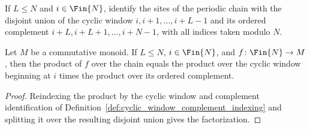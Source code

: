 \begin{definition}
    \label{def:cyclic_window_complement_indexing}
    \leanok
    If $L\leq N$ and $i\in\Fin{N}$, identify the sites of the periodic chain
    with the disjoint union of the cyclic window
    $i,i+1,\ldots,i+L-1$ and its ordered complement
    $i+L,i+L+1,\ldots,i+N-1$, with all indices taken modulo $N$.
\end{definition}

\begin{lemma}
    \label{thm:cyclic_window_complement_product_factorization}
    \leanok
    Let $M$ be a commutative monoid. If $L\leq N$, $i\in\Fin{N}$, and
    $f\colon\Fin{N}\to M$, then the product of $f$ over the chain equals the
    product over the cyclic window beginning at $i$ times the product over its
    ordered complement.
\end{lemma}

\begin{proof}
    \leanok
    Reindexing the product by the cyclic window and complement identification of
    Definition~\ref{def:cyclic_window_complement_indexing} and splitting it
    over the resulting disjoint union gives the factorization.
\end{proof}

